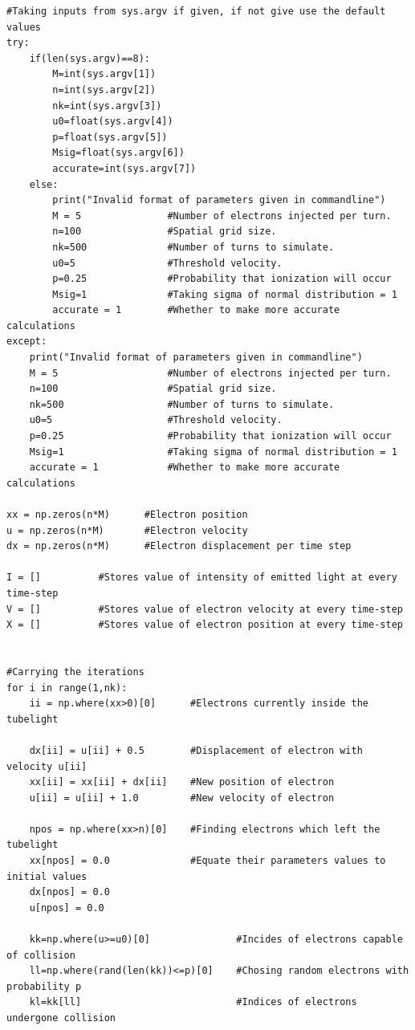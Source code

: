 \documentclass[11pt, a4paper]{article}
\begin{document}
\begin{lstlisting}
#Taking inputs from sys.argv if given, if not give use the default values
try:
    if(len(sys.argv)==8):
        M=int(sys.argv[1])
        n=int(sys.argv[2])
        nk=int(sys.argv[3])  
        u0=float(sys.argv[4])
        p=float(sys.argv[5])
        Msig=float(sys.argv[6])
        accurate=int(sys.argv[7])
    else:
        print("Invalid format of parameters given in commandline")
        M = 5               #Number of electrons injected per turn.
        n=100               #Spatial grid size.
        nk=500              #Number of turns to simulate.
        u0=5                #Threshold velocity.
        p=0.25              #Probability that ionization will occur
        Msig=1              #Taking sigma of normal distribution = 1
        accurate = 1        #Whether to make more accurate calculations
except:
    print("Invalid format of parameters given in commandline")
    M = 5                   #Number of electrons injected per turn.
    n=100                   #Spatial grid size.
    nk=500                  #Number of turns to simulate.
    u0=5                    #Threshold velocity.
    p=0.25                  #Probability that ionization will occur
    Msig=1                  #Taking sigma of normal distribution = 1
    accurate = 1            #Whether to make more accurate calculations

xx = np.zeros(n*M)      #Electron position
u = np.zeros(n*M)       #Electron velocity  
dx = np.zeros(n*M)      #Electron displacement per time step

I = []          #Stores value of intensity of emitted light at every time-step
V = []          #Stores value of electron velocity at every time-step
X = []          #Stores value of electron position at every time-step    


#Carrying the iterations
for i in range(1,nk):
    ii = np.where(xx>0)[0]      #Electrons currently inside the tubelight
    
    dx[ii] = u[ii] + 0.5        #Displacement of electron with velocity u[ii]
    xx[ii] = xx[ii] + dx[ii]    #New position of electron
    u[ii] = u[ii] + 1.0         #New velocity of electron
    
    npos = np.where(xx>n)[0]    #Finding electrons which left the tubelight
    xx[npos] = 0.0              #Equate their parameters values to initial values
    dx[npos] = 0.0
    u[npos] = 0.0
    
    kk=np.where(u>=u0)[0]               #Incides of electrons capable of collision
    ll=np.where(rand(len(kk))<=p)[0]    #Chosing random electrons with probability p
    kl=kk[ll]                           #Indices of electrons undergone collision
    

\end{lstlisting}
\end{document}
